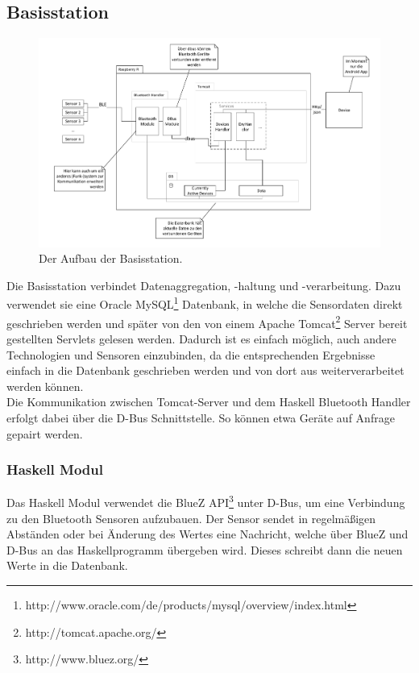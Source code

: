 \subsection{Basisstation}
\begin{figure}[htb] 
	\centerline{\includegraphics[scale=.4]{Architektur/BaseStation_v2.pdf} }
	\caption{Der Aufbau der Basisstation.}
\end{figure}

Die Basisstation verbindet Datenaggregation, -haltung und -verarbeitung. Dazu verwendet sie eine Oracle MySQL\footnote{http://www.oracle.com/de/products/mysql/overview/index.html} Datenbank, in welche die Sensordaten direkt geschrieben werden und später von den von einem Apache Tomcat\footnote{http://tomcat.apache.org/} Server bereit gestellten Servlets gelesen werden. Dadurch ist es einfach möglich, auch andere Technologien und Sensoren einzubinden, da die entsprechenden Ergebnisse einfach in die Datenbank geschrieben werden und von dort aus weiterverarbeitet werden können.\\
Die Kommunikation zwischen Tomcat-Server und dem Haskell Bluetooth Handler erfolgt dabei über die D-Bus Schnittstelle. So können etwa Geräte auf Anfrage gepairt werden.
\subsubsection{Haskell Modul}
 Das Haskell Modul verwendet die BlueZ API\footnote{http://www.bluez.org/} unter D-Bus, um eine Verbindung zu den Bluetooth Sensoren aufzubauen. Der Sensor sendet in regelmäßigen Abständen oder bei Änderung des Wertes eine Nachricht, welche über BlueZ und D-Bus an das Haskellprogramm übergeben wird. Dieses schreibt dann die neuen Werte in die Datenbank.
	
